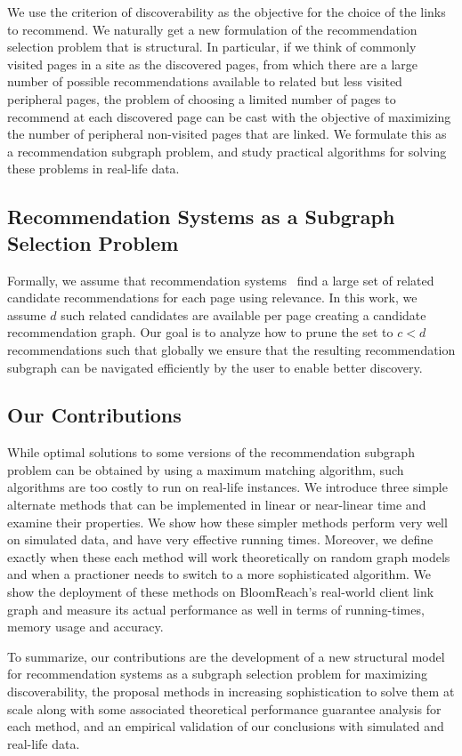 We use the criterion of discoverability as the objective for the choice of the links to recommend. We naturally get a new formulation of the recommendation selection problem that is structural. In particular, if we think of commonly visited pages in a site as the discovered pages, from which there are a large number of possible recommendations available to related but less visited peripheral pages, the problem of choosing a limited number of pages to recommend at each discovered page can be cast with the objective of maximizing the number of peripheral non-visited pages that are linked. We formulate this as a recommendation subgraph problem, and study practical algorithms for solving these problems in real-life data. 

\subsection{Recommendation Systems as a Subgraph Selection Problem}

Formally, we assume that recommendation systems~\cite{Schafer1999, Adomavicius2005,
  Resnick1997} find a large set of related candidate recommendations
for each page using relevance. In this work, we assume $d$
such related candidates are available per page creating a candidate recommendation graph.
Our goal is to analyze how to prune the set to $c < d$ recommendations such that
globally we ensure that the resulting recommendation subgraph can be navigated efficiently by the user to enable better discovery.

\subsection{Our Contributions}
While optimal solutions to some versions of the recommendation subgraph problem can be obtained by using a maximum matching algorithm, such algorithms are too costly to run on real-life instances. We introduce three simple alternate methods that can be implemented in linear or near-linear time and examine their properties. We show how these simpler methods perform very well on simulated data, and have very effective running times. Moreover, we define exactly when these
each method will work theoretically on random graph models and when a practioner needs to switch to a more sophisticated algorithm. We show the deployment of these methods on BloomReach's real-world client link graph and measure its
actual performance as well in terms of running-times, memory usage and accuracy.

To summarize, our contributions are the development of a new structural model for recommendation systems as a subgraph selection problem for maximizing discoverability, the proposal methods in increasing sophistication to solve them at scale along with some associated theoretical performance guarantee analysis for each method, and an empirical validation of our conclusions with simulated and real-life data.

